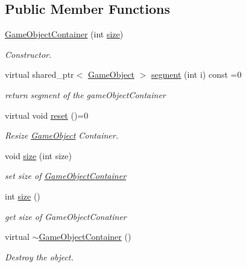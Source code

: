\subsection*{Public Member Functions}
\begin{DoxyCompactItemize}
\item 
\mbox{\hyperlink{class_game_object_container_ad3b33550acd14414d6434e6836885f3c}{Game\+Object\+Container}} (int \mbox{\hyperlink{class_game_object_container_a4502e18e58c774b681e7ef8e6319910d}{size}})
\begin{DoxyCompactList}\small\item\em Constructor. \end{DoxyCompactList}\item 
virtual shared\+\_\+ptr$<$ \mbox{\hyperlink{class_game_object}{Game\+Object}} $>$ \mbox{\hyperlink{class_game_object_container_affa50b43ca7b82d54055b6499e024aba}{segment}} (int i) const =0
\begin{DoxyCompactList}\small\item\em return segment of the game\+Object\+Container \end{DoxyCompactList}\item 
\mbox{\label{class_game_object_container_a13ed0612c4c8226f196c9c219f38cb65}} 
virtual void \mbox{\hyperlink{class_game_object_container_a13ed0612c4c8226f196c9c219f38cb65}{reset}} ()=0
\begin{DoxyCompactList}\small\item\em Resize \mbox{\hyperlink{class_game_object}{Game\+Object}} Container. \end{DoxyCompactList}\item 
void \mbox{\hyperlink{class_game_object_container_a4502e18e58c774b681e7ef8e6319910d}{size}} (int size)
\begin{DoxyCompactList}\small\item\em set size of \mbox{\hyperlink{class_game_object_container}{Game\+Object\+Container}} \end{DoxyCompactList}\item 
int \mbox{\hyperlink{class_game_object_container_afda69d0805c2ee12dd2b972fd66b34c9}{size}} ()
\begin{DoxyCompactList}\small\item\em get size of Game\+Object\+Conatiner \end{DoxyCompactList}\item 
\mbox{\label{class_game_object_container_a84e10f78eae954c67c6c0ac30797a8bf}} 
virtual \mbox{\hyperlink{class_game_object_container_a84e10f78eae954c67c6c0ac30797a8bf}{$\sim$\+Game\+Object\+Container}} ()
\begin{DoxyCompactList}\small\item\em Destroy the object. \end{DoxyCompactList}\end{DoxyCompactItemize}
